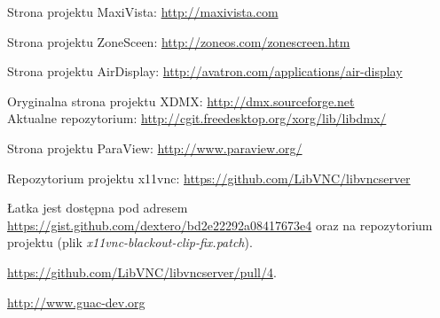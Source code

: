 \pagebreak
\begin{thebibliography}{9}

    Strona projektu MaxiVista: \url{http://maxivista.com}

    Strona projektu ZoneSceen: \url{http://zoneos.com/zonescreen.htm}

    Strona projektu AirDisplay: \url{http://avatron.com/applications/air-display}

    Oryginalna strona projektu XDMX: \url{http://dmx.sourceforge.net} \\
    Aktualne repozytorium: \url{http://cgit.freedesktop.org/xorg/lib/libdmx/}

    Strona projektu ParaView: \url{http://www.paraview.org/}

    Repozytorium projektu x11vnc: \url{https://github.com/LibVNC/libvncserver}

    Łatka jest dostępna pod adresem \url{https://gist.github.com/dextero/bd2e22292a08417673e4} oraz na repozytorium projektu (plik \emph{x11vnc-blackout-clip-fix.patch}).

    \url{https://github.com/LibVNC/libvncserver/pull/4}.

    \url{http://www.guac-dev.org}

\end{thebibliography}




